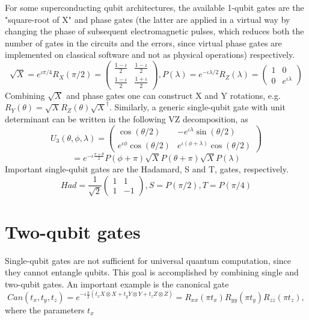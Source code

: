 \documentclass[12pt, oneside]{book}
\theoremstyle{definition}
\theoremstyle{definition}
\theoremstyle{remark}
\begin{document}
For some superconducting qubit architectures, the available 1-qubit gates are the "square-root of X" and phase gates (the latter are applied in a virtual way by changing the phase of subsequent electromagnetic pulses, which reduces both the number of gates in the circuits and the errors, since virtual phase gates are implemented on classical software and not as physical operations) respectively.
\[
\sqrt{X}=e^{\iota \pi/4}R_X(\pi/2)=\begin{pmatrix} \frac{1-\iota}{2} & \frac{1-\iota}{2} \\ \frac{1-\iota}{2} & \frac{1+\iota}{2} \end{pmatrix}, P(\lambda)=e^{-\iota\lambda/2} R_Z(\lambda) =\begin{pmatrix}1 & 0 \\ 0 & e^{\iota\lambda} \end{pmatrix}
\]
Combining $\sqrt{X}$ and phase gates one can construct X and Y rotations, e.g. $R_Y(\theta)=\sqrt{X}R_Z(\theta)\sqrt{X}^{\dagger}$. Similarly, a generic single-qubit gate with unit determinant can be written in the following VZ decomposition, as
\[
U_3(\theta,\phi,\lambda)=\begin{pmatrix} \cos (\theta/2) & -e^{\iota \lambda} \sin (\theta/2) \\ e^{\iota \phi}\cos (\theta/2) & e^{\iota (\phi+\lambda)} \cos(\theta/2) \end{pmatrix}
\]
\[
=e^{-\iota\frac{\pi +\theta}{2}}P(\phi+\pi)\sqrt{X}P(\theta+\pi)\sqrt{X}P(\lambda)
\]
Important single-qubit gates are the Hadamard, S and T, gates, respectively.
\[
Had=\frac{1}{\sqrt{2}}\begin{pmatrix} 1 & 1 \\ 1 & -1 \end{pmatrix}, S=P(\pi/2), T=P(\pi/4)
\]

\section{Two-qubit gates}
Single-qubit gates are not sufficient for universal quantum computation, since they cannot entangle qubits. This goal is accomplished by combining single and two-qubit gates. An important example is the canonical gate
\[
Can(t_x,t_y,t_z)=e^{-\iota \frac{\pi}{2} (t_xX\otimes X+t_yY\otimes Y+t_z Z \otimes Z)}=R_{xx}(\pi t_x)R_{yy}(\pi t_y)R_{zz} (\pi t_z),
\]
where the parameters $t_x$
\end{document}
